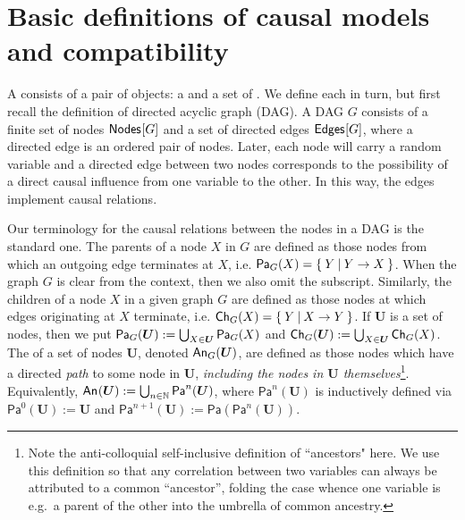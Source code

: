 \section{Basic definitions of causal models and compatibility}\label{sec:definitions}

A  consists of a pair of objects: a  and a set of .  We define each in turn, 
but first recall the definition of directed acyclic graph (DAG). A DAG $G$ consists of a finite set of nodes $\nodes{G}$ and a set of directed edges $\edges{G}$, where a directed edge is an ordered pair of nodes. Later, each node will carry a random variable and a directed edge between two nodes corresponds to the possibility of a direct causal influence from one variable to the other. In this way, the edges implement causal relations.

Our terminology for the causal relations between the nodes in a DAG is the standard one. The parents of a node $X$ in $G$ are defined as those nodes from which an outgoing edge terminates at $X$, i.e. $\Pa[G]{X} = \{\:Y\:|\:Y\to X\:\}$. When the graph $G$ is clear from the context, then we also omit the subscript. Similarly, the children of a node $X$ in a given graph $G$ are defined as those nodes at which edges originating at $X$ terminate, i.e. $\Ch[G]{X} = \{\:Y\:|\: X\to Y\:\}$. If $\bm{U}$ is a set of nodes, then we put $\Pa[G]{\bm{U}} := \bigcup_{X\in\bm{U}} \Pa[G]{X}$ and $\Ch[G]{\bm{U}} := \bigcup_{X\in\bm{U}} \Ch[G]{X}$. The  of a set of nodes $\bm{U}$, denoted $\An[G]{\bm{U}}$, are defined as those nodes which have a directed \emph{path} to some node in $\bm{U}$, \emph{including the nodes in $\bm{U}$ themselves}\footnote{Note the anti-colloquial self-inclusive definition of ``ancestors" here. We use this definition so that any correlation between two variables can always be attributed to a common ``ancestor'', folding the case whence one variable is e.g.~a parent of the other into the umbrella of common ancestry.}. %
Equivalently, $\An{\bm{U}} := \bigcup_{n\in\mathbb{N}} \mathsf{Pa}^n(\bm{U})$, where $\mathsf{Pa}^n(\bm{U})$ is inductively defined via $\mathsf{Pa}^0(\bm{U}) := \bm{U}$ and $\mathsf{Pa}^{n+1}(\bm{U}) := \mathsf{Pa}(\mathsf{Pa}^n(\bm{U}))$. 

